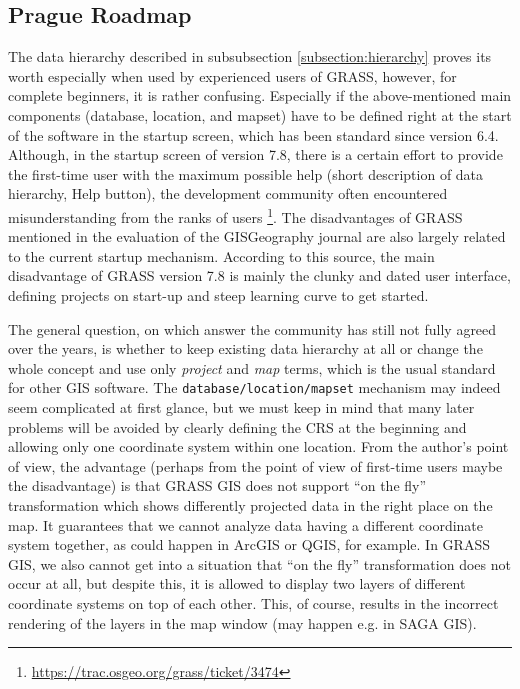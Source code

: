 \documentclass[a4paper,10pt,twoside]{article}
\begin{document}
\subsection{Prague Roadmap}
\label{section:Prague Roadmap}
\noindent
\large The data hierarchy described in subsubsection
\ref{subsection:hierarchy} proves its worth especially when used by
experienced users of GRASS, however, for complete beginners, it is
rather confusing. Especially if the above-mentioned main components
(database, location, and mapset) have to be defined right at the start
of the software in the startup screen, which has been standard since
version 6.4.  Although, in the startup screen of version 7.8, there is
a certain effort to provide the first-time user with the maximum
possible help (short description of data hierarchy, Help button), the
development community often encountered misunderstanding from the
ranks of users
\footnote{\url{https://trac.osgeo.org/grass/ticket/3474}}. The
disadvantages of GRASS mentioned in the evaluation of the GISGeography
journal \cite{gisgeography} are also largely related to the current
startup mechanism. According to this source, the main disadvantage of
GRASS version 7.8 is mainly the clunky and dated user interface,
defining projects on start-up and steep learning curve to get started.

The general question, on which answer the community has still not
fully agreed over the years, is whether to keep existing data
hierarchy at all or change the whole concept and use only
\textit{project} and \textit{map} terms, which is the usual standard
for other GIS software. The \texttt {database/location/mapset}
mechanism may indeed seem complicated at first glance, but we must
keep in mind that many later problems will be avoided by clearly
defining the CRS at the beginning and allowing only one coordinate
system within one location. From the author’s point of view, the
advantage (perhaps from the point of view of first-time users maybe
the disadvantage) is that GRASS GIS does not support ``on the fly''
transformation which shows differently projected data in the right
place on the map. It guarantees that we cannot analyze data having a
different coordinate system together, as could happen in ArcGIS or
QGIS, for example. In GRASS GIS, we also cannot get into a situation
that ``on the fly'' transformation does not occur at all, but despite
this, it is allowed to display two layers of different coordinate
systems on top of each other. This, of course, results in the
incorrect rendering of the layers in the map window (may happen
e.g. in SAGA GIS).
\end{document}
